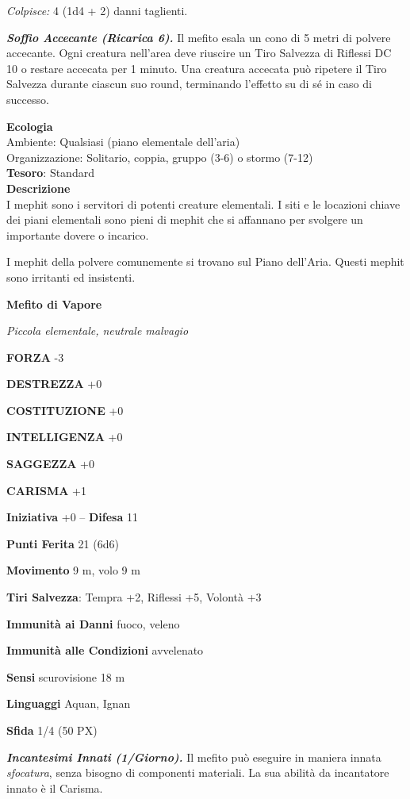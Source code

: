 \begin{multicols}{2}
\textit{Colpisce:} 4 (1d4 + 2) danni taglienti.

\textit{\textbf{Soffio Accecante (Ricarica 6).}} Il mefito esala un cono di 5 metri di polvere accecante. Ogni creatura nell'area deve riuscire un Tiro Salvezza di Riflessi DC 10 o restare accecata per 1 minuto. Una creatura accecata può ripetere il Tiro Salvezza durante ciascun suo round, terminando l'effetto su di sé in caso di successo.

\textbf{Ecologia}\\
Ambiente: Qualsiasi (piano elementale dell'aria)\\
Organizzazione: Solitario, coppia, gruppo (3-6) o stormo (7-12)\\
\textbf{Tesoro}: Standard\\
\textbf{Descrizione}\\
I mephit sono i servitori di potenti creature elementali. I siti e le locazioni chiave dei piani elementali sono pieni di mephit che si affannano per svolgere un importante dovere o incarico.

I mephit della polvere comunemente si trovano sul Piano dell'Aria. Questi mephit sono irritanti ed insistenti.

\medskip{}\textbf{Mefito di Vapore}

\textit{Piccola elementale, neutrale malvagio}

\textbf{FORZA} -3

\textbf{DESTREZZA} +0

\textbf{COSTITUZIONE} +0

\textbf{INTELLIGENZA} +0

\textbf{SAGGEZZA} +0

\textbf{CARISMA} +1

\textbf{Iniziativa} +0 -- \textbf{Difesa} 11

\textbf{Punti Ferita} 21 (6d6)

\textbf{Movimento} 9 m, volo 9 m

\textbf{Tiri Salvezza}: Tempra +2, Riflessi +5, Volontà +3

\textbf{Immunità ai Danni} fuoco, veleno

\textbf{Immunità alle Condizioni} avvelenato

\textbf{Sensi} scurovisione 18 m

\textbf{Linguaggi} Aquan, Ignan

\textbf{Sfida} 1/4 (50 PX)

\textit{\textbf{Incantesimi Innati (1/Giorno).}} Il mefito può eseguire in maniera innata \textit{sfocatura}, senza bisogno di componenti materiali. La sua abilità da incantatore innato è il Carisma.


\end{multicols}
